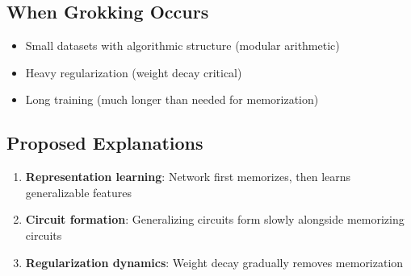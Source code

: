 \subsection{When Grokking Occurs}

\begin{itemize}
    \item Small datasets with algorithmic structure (modular arithmetic)
    \item Heavy regularization (weight decay critical)
    \item Long training (much longer than needed for memorization)
\end{itemize}

\subsection{Proposed Explanations}

\begin{enumerate}
    \item \textbf{Representation learning}: Network first memorizes, then learns generalizable features
    \item \textbf{Circuit formation}: Generalizing circuits form slowly alongside memorizing circuits
    \item \textbf{Regularization dynamics}: Weight decay gradually removes memorization
\end{enumerate}

